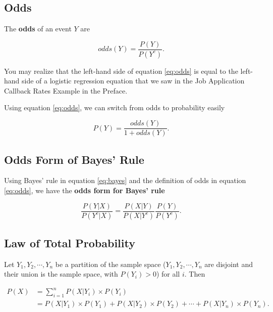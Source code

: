 \documentclass[
]{book}
\begin{document}
\hypertarget{odds}{%
\subsection{Odds}\label{odds}}

The \textbf{odds} of an event \(Y\) are

\begin{equation} 
odds(Y) = \frac{P(Y)}{P(Y^c)}.
\label{eq:odds}
\end{equation}

You may realize that the left-hand side of equation \eqref{eq:odds} is equal to the left-hand side of a logistic regression equation that we saw in the Job Application Callback Rates Example in the Preface.

Using equation \eqref{eq:odds}, we can switch from odds to probability easily

\begin{equation} 
P(Y) = \frac{odds(Y)}{1 + odds(Y)}.
\label{eq:odds2}
\end{equation}

\hypertarget{odds-form-of-bayes-rule}{%
\subsection{Odds Form of Bayes' Rule}\label{odds-form-of-bayes-rule}}

Using Bayes' rule in equation \eqref{eq:bayes} and the definition of odds in equation \eqref{eq:odds}, we have the \textbf{odds form for Bayes' rule}

\begin{equation} 
\frac{P(Y|X)}{P(Y^c|X)} = \frac{P(X|Y)}{P(X|Y^c)} \frac{P(Y)}{P(Y^c)}. 
\label{eq:oddsbayes}
\end{equation}

\hypertarget{law-of-total-probability}{%
\subsection{Law of Total Probability}\label{law-of-total-probability}}

Let \(Y_1, Y_2, \cdots, Y_n\) be a partition of the sample space (\(Y_1, Y_2, \cdots, Y_n\) are disjoint and their union is the sample space, with \(P(Y_i) > 0\)) for all \(i\). Then

\begin{equation} 
\begin{split}
P(X) &= \sum_{i=1}^n P(X|Y_i) \times P(Y_i)\\
    &= P(X|Y_1) \times P(Y_1) + P(X|Y_2) \times P(Y_2) + \cdots + P(X|Y_n) \times P(Y_n).
\end{split}
\label{eq:total}
\end{equation}
\end{document}
